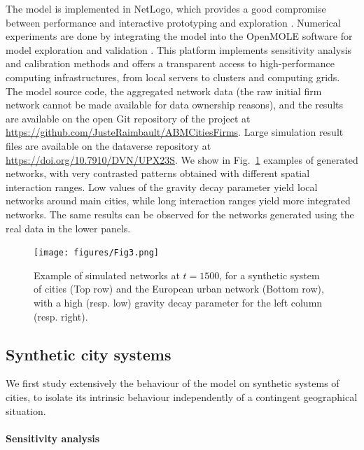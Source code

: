 \documentclass[10pt,letterpaper]{article}
\begin{document}
The model is implemented in NetLogo, which provides a good compromise between performance and interactive prototyping and exploration \cite{railsback2017improving}. Numerical experiments are done by integrating the model into the OpenMOLE software for model exploration and validation \cite{reuillon2013openmole}. This platform implements sensitivity analysis and calibration methods and offers a transparent access to high-performance computing infrastructures, from local servers to clusters and computing grids. The model source code, the aggregated network data (the raw initial firm network cannot be made available for data ownership reasons), and the results are available on the open Git repository of the project at \url{https://github.com/JusteRaimbault/ABMCitiesFirms}. Large simulation result files are available on the dataverse repository at \url{https://doi.org/10.7910/DVN/UPX23S}. We show in Fig.~\ref{fig:fig3} examples of generated networks, with very contrasted patterns obtained with different spatial interaction ranges. Low values of the gravity decay parameter yield local networks around main cities, while long interaction ranges yield more integrated networks. The same results can be observed for the networks generated using the real data in the lower panels.


\begin{figure}
    \begin{center}
        \texttt{[image: figures/Fig3.png]}
    \end{center}
    \caption{Example of simulated networks at $t=1500$, for a synthetic system of cities (Top row) and the European urban network (Bottom row), with a high (resp. low) gravity decay parameter for the left column (resp. right).\label{fig:fig3}}
\end{figure}


\subsection*{Synthetic city systems}

We first study extensively the behaviour of the model on synthetic systems of cities, to isolate its intrinsic behaviour independently of a contingent geographical situation.

\paragraph{Sensitivity analysis}
\end{document}
